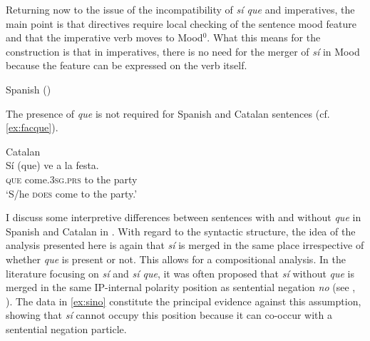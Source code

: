 Returning now to the issue of   the incompatibility of \emph{sí que} and imperatives, the main point is  that directives  require local checking of the sentence mood feature and that the imperative verb moves to Mood$^0$.  What this means for the  construction is that in imperatives, there is no need for the merger of \emph{sí} in Mood because the  feature can be expressed on the verb itself.

\ea Spanish (\citealt[27: ex 49]{Kocher2018b})

\z
\z



The presence of \emph{que} is not required for Spanish and Catalan  sentences (cf. \ref{ex:facque}). 

\ea\label{ex:facque}
Catalan\\
\gll Sí (que) ve a la festa. \\
\textsc{} \textsc{que} come.\textsc{3sg.prs} to the party\\
\glt `S/he \textsc{does} come to the party.'
\z

I discuss  some interpretive differences between  sentences with and without \emph{que} in Spanish and Catalan in . With regard to the syntactic structure, the idea of the  analysis presented here is again that \emph{sí} is merged in the same place irrespective of whether \emph{que} is present or not. This allows for a compositional analysis. In the literature focusing on \emph{sí} and \emph{sí que}, it was often proposed that \emph{sí} without \emph{que} is merged in the same IP-internal polarity position as sentential negation \emph{no}  (see \citealt{Hernanz2007}, \citealt{VillaGarcia2020b, VillaGarcia2020a}). The data in \eqref{ex:sino} constitute the principal evidence against this assumption, showing that \emph{sí} cannot occupy this position because it can co-occur with a sentential negation particle.\pagebreak

